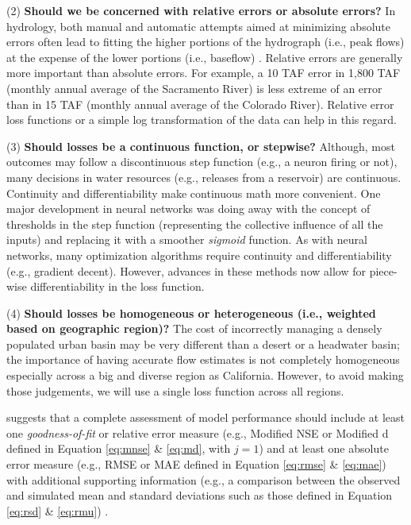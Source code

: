 (2) \textbf{Should we be concerned with relative errors or absolute errors?} In hydrology, both manual and automatic attempts aimed at minimizing absolute errors often lead to fitting the higher portions of the hydrograph (i.e., peak flows) at the expense of the lower portions (i.e., baseflow) \cite{krause2005comparison}. Relative errors are generally more important than absolute errors. For example, a 10 TAF error in 1,800 TAF (monthly annual average of the Sacramento River) is less extreme of an error than in 15 TAF (monthly annual average of the Colorado River). Relative error loss functions or a simple log transformation of the data can help in this regard. 

(3) \textbf{Should losses be a continuous function, or stepwise?} Although, most outcomes may follow a discontinuous step function (e.g., a neuron firing or not), many decisions in water resources (e.g., releases from a reservoir) are continuous. Continuity and differentiability make continuous math more convenient. One major development in neural networks was doing away with the concept of thresholds in the step function (representing the collective influence of all the inputs) and replacing it with a smoother \textit{sigmoid} function. As with neural networks, many optimization algorithms require continuity and differentiability (e.g., gradient decent). However, advances in these methods now allow for piece-wise differentiability in the loss function.

(4) \textbf{Should losses be homogeneous or heterogeneous (i.e., weighted based on geographic region)?} The cost of incorrectly managing a densely populated urban basin may be very different than a desert or a headwater basin; the importance of having accurate flow estimates is not completely homogeneous especially across a big and diverse region as California. However, to avoid making those judgements, we will use a single loss function across all regions. 

 suggests that a complete assessment of model performance should include at least one \textit{goodness-of-fit} or relative error measure (e.g., Modified NSE or Modified d defined in Equation \ref{eq:mnse} \& \ref{eq:md}, with $j=1$) and at least one absolute error measure (e.g., RMSE or MAE defined in Equation \ref{eq:rmse} \& \ref{eq:mae}) with additional supporting information (e.g., a comparison between the observed and simulated mean and standard deviations such as those defined in Equation \ref{eq:rsd} \& \ref{eq:rmu}) \cite{legates1999evaluating}. 

